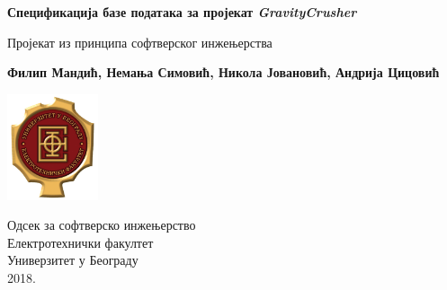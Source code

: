 \begin{titlepage}
    \begin{center}

        \vspace*{1cm}

        \Huge
        \textbf{Спецификација базе података за пројекат \textit{GravityCrusher}}

        \vspace{0.5cm}
        \LARGE
        Пројекат из принципа софтверског инжењерства

        \vspace{1.5cm}
        \Large      
        \textbf{Филип Мандић, Немања Симовић,
        Никола Јовановић, Андрија Цицовић}

        \vfill

        \includegraphics[width=0.2\textwidth]{../resources/etflogo}

        \large
        Одсек за софтверско инжењерство\\
        Електротехнички факултет\\
        Универзитет у Београду\\
        2018.

    \end{center}
\end{titlepage}
